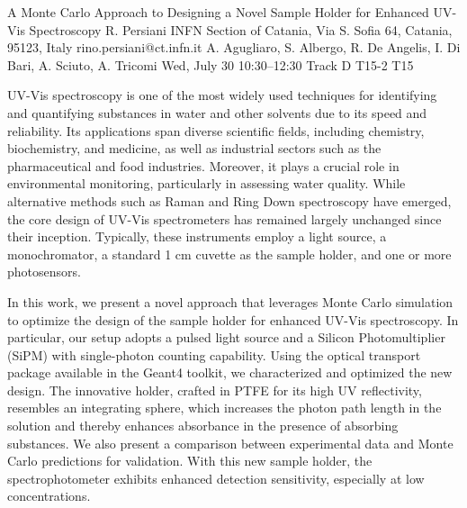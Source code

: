 \begin{talk}
  {A Monte Carlo Approach to Designing a Novel Sample Holder for Enhanced UV-Vis Spectroscopy}%
  {R. Persiani}%
  {INFN Section of Catania, Via S. Sofia 64, Catania, 95123, Italy}%
  {rino.persiani@ct.infn.it}%
  {A. Agugliaro, S. Albergo, R. De Angelis, I. Di Bari, A. Sciuto, A. Tricomi}%
  {}%
  {Wed, July 30 10:30–12:30 Track D}%
  {T15-2}%
  {T15}%
			
UV-Vis spectroscopy is one of the most widely used techniques for identifying and quantifying substances in water and other solvents due to its speed and reliability. Its applications span diverse scientific fields, including chemistry, biochemistry, and medicine, as well as industrial sectors such as the pharmaceutical and food industries. Moreover, it plays a crucial role in environmental monitoring, particularly in assessing water quality. While alternative methods such as Raman and Ring Down spectroscopy have emerged, the core design of UV-Vis spectrometers has remained largely unchanged since their inception. Typically, these instruments employ a light source, a monochromator, a standard 1 cm cuvette as the sample holder, and one or more photosensors.

In this work, we present a novel approach that leverages Monte Carlo simulation to optimize the design of the sample holder for enhanced UV-Vis spectroscopy. In particular, our setup adopts a pulsed light source and a Silicon Photomultiplier (SiPM) with single-photon counting capability. Using the optical transport package available in the Geant4 toolkit, we characterized and optimized the new design. The innovative holder, crafted in PTFE for its high UV reflectivity, resembles an integrating sphere, which increases the photon path length in the solution and thereby enhances absorbance in the presence of absorbing substances. We also present a comparison between experimental data and Monte Carlo predictions for validation. With this new sample holder, the spectrophotometer exhibits enhanced detection sensitivity, especially at low concentrations.

\medskip

\end{talk}
